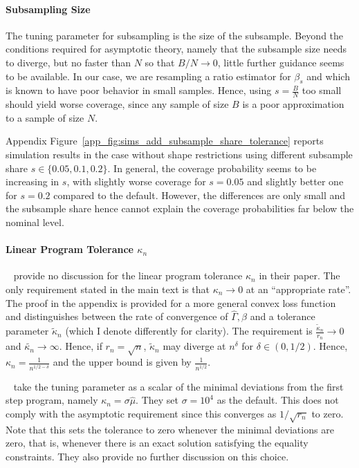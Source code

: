 \documentclass[12pt,a4paper,english]{article} %
\numberwithin{equation}{section}
\theoremstyle{definition}
\theoremstyle{remark}
\theoremstyle{plain}
\begin{document}
\paragraph{Subsampling Size}
The tuning parameter for subsampling is the size of the subsample.
Beyond the conditions required for asymptotic theory, namely that the subsample size needs to diverge, but no faster than $N$ so that $B/N \to 0$, little further guidance seems to be available.
In our case, we are resampling a ratio estimator for $\beta_s$ and which is known to have poor behavior in small samples.
Hence, using $s = \frac{B}{N}$ too small should yield worse coverage, since any sample of size $B$ is a poor approximation to a sample of size $N$.

Appendix Figure~\ref{app_fig:sims_add_subsample_share_tolerance} reports simulation results in the case without shape restrictions using different subsample share $s \in \{0.05, 0.1, 0.2\}$.
In general, the coverage probability seems to be increasing in $s$, with slightly worse coverage for $s=0.05$ and slightly better one for $s=0.2$ compared to the default.
However, the differences are only small and the subsample share hence cannot explain the coverage probabilities far below the nominal level.

\paragraph{Linear Program Tolerance $\kappa_n$}
~\cite{mogstad2018using} provide no discussion for the linear program tolerance $\kappa_n$ in their paper.
The only requirement stated in the main text is that $\kappa_n \to 0$ at an ``appropriate rate''.
The proof in the appendix is provided for a more general convex loss function and distinguishes between the rate of convergence of $\hat{\Gamma}, \hat{\beta}$ and a tolerance parameter $\tilde{\kappa}_n$ (which I denote differently for clarity).
The requirement is $\frac{\tilde{\kappa}_n}{r_n} \to 0$ and $\tilde{\kappa_n}\to \infty$. Hence, if $r_n = \sqrt{n}$, $\tilde{\kappa}_n$ may diverge at $n^\delta$ for $\delta \in (0, 1/2)$.
Hence, $\kappa_n = \frac{1}{n^{1/2 - \delta}}$ and the upper bound is given by $\frac{1}{n^{1/2}}$.

~\cite{shea2023ivmte} take the tuning parameter as a scalar of the minimal deviations from the first step program, namely $\kappa_n = \sigma \hat{\mu}$. They set $\sigma = 10^4$ as the default.
This does not comply with the asymptotic requirement since this converges as $1/\sqrt{r_n}$ to zero.
Note that this sets the tolerance to zero whenever the minimal deviations are zero, that is, whenever there is an exact solution satisfying the equality constraints.
They also provide no further discussion on this choice.
\end{document}
